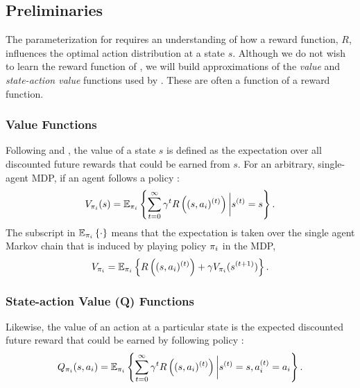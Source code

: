 \subsection{Preliminaries}\label{sec:policy_iteration_preliminaries}
    The parameterization for  requires an understanding of how a reward function, $R$, influences the
    optimal action distribution at a state $s$. Although we do not wish to learn the reward function of , we
    will build approximations of the \textit{value} and \textit{state-action value} functions used by . These
    are often a function of a reward function.

\subsubsection{Value Functions}
    Following \cite{hernandez2012adaptive} and \cite{Sugiyama2015StatisticalRL}, the value of a state $s$ is defined as
    the expectation over all discounted future rewards that could be earned from $s$. For an arbitrary, single-agent
    \ac{MDP}, if an agent  follows a policy :
    \[
    V_{\pi_{i}}(s) = \mathbb{E}_{\pi_{i}}\left\{\sum_{t=0}^{\infty} \gamma^t R\left((s,a_i)^{(t)}\right)
            \bigg|s^{(t)}=s\right\}.
    \]
    The subscript in $\mathbb{E}_{\pi_{i}}\left\{\cdot\right\}$ means that the expectation is taken over the single agent Markov
    chain that is induced by  playing policy $\pi_{i}$ in the \ac{MDP},
    \[
    V_{\pi_{i}} = \mathbb{E}_{\pi_{i}}\left\{R\left((s,a_i)^{(t)}\right) + \gamma V_{\pi_{i}}(s^{(t+1)})\right\}.
    \]

\subsubsection{State-action Value (Q) Functions}
    Likewise, the value of an action at a particular state is the expected discounted future reward that could be earned
    by following policy :
    \[
    Q_{\pi_{i}}(s,a_i) = \mathbb{E}_{\pi_{i}}\left\{\sum_{t=0}^{\infty} \gamma^t R\left((s,a_i)^{(t)}\right)
            \bigg|s^{(t)}=s, a_i^{(t)}=a_i\right\}.
    \]


